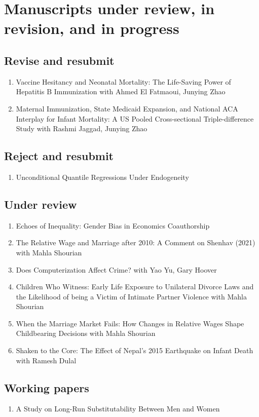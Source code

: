 \documentclass[10.5pt]{article}
\begin{document}
\section{Manuscripts under review, in revision, and in progress}
\subsection{Revise and resubmit}
\begin{enumerate}
\item Vaccine Hesitancy and Neonatal Mortality: The Life-Saving Power of Hepatitis B Immunization with Ahmed El Fatmaoui, Junying Zhao
\item Maternal Immunization, State Medicaid Expansion, and National ACA Interplay for Infant Mortality: A US Pooled Cross-sectional Triple-difference Study with Rashmi Jaggad, Junying Zhao
\end{enumerate}
\subsection{Reject and resubmit}
\begin{enumerate}
\item Unconditional Quantile Regressions Under Endogeneity
\end{enumerate}
\subsection{Under review}
\begin{enumerate}
\item Echoes of Inequality: Gender Bias in Economics Coauthorship
\item The Relative Wage and Marriage after 2010: A Comment on Shenhav (2021) with Mahla Shourian
\item Does Computerization Affect Crime? with Yao Yu, Gary Hoover
\item Children Who Witness: Early Life Exposure to Unilateral Divorce Laws and the Likelihood of being a Victim of Intimate Partner Violence with Mahla Shourian
\item When the Marriage Market Fails: How Changes in Relative Wages Shape Childbearing Decisions with Mahla Shourian
\item Shaken to the Core: The Effect of Nepal's 2015 Earthquake on Infant Death with Ramesh Dulal
\end{enumerate}
\subsection{Working papers}
\begin{enumerate}
\item A Study on Long-Run Substitutability Between Men and Women
\end{enumerate}
\end{document}
